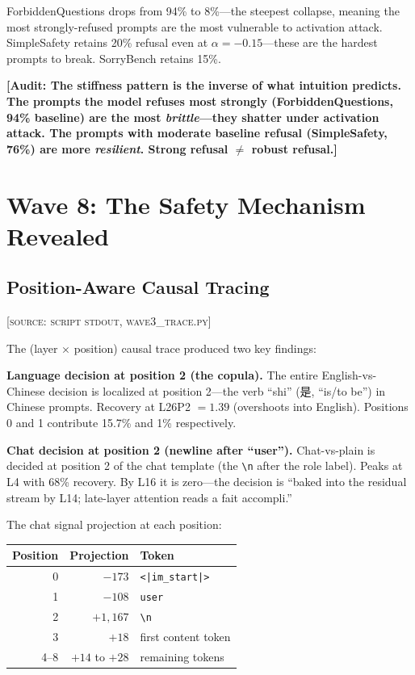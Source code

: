 \documentclass[11pt,a4paper]{article}
\newcommand{\audit}[1]{\textcolor{audit}{\textbf{[Audit: #1]}}}
\begin{document}
ForbiddenQuestions drops from 94\% to 8\%---the steepest collapse, meaning the most strongly-refused prompts are the most vulnerable to activation attack. SimpleSafety retains 20\% refusal even at $\alpha=-0.15$---these are the hardest prompts to break. SorryBench retains 15\%.

\audit{The stiffness pattern is the inverse of what intuition predicts. The prompts the model refuses most strongly (ForbiddenQuestions, 94\% baseline) are the most \textit{brittle}---they shatter under activation attack. The prompts with moderate baseline refusal (SimpleSafety, 76\%) are more \textit{resilient}. Strong refusal $\neq$ robust refusal.}

\section{Wave 8: The Safety Mechanism Revealed}

\subsection{Position-Aware Causal Tracing}
\textsc{[source: script stdout, wave3\_trace.py]}

The (layer $\times$ position) causal trace produced two key findings:

\textbf{Language decision at position 2 (the copula).} The entire English-vs-Chinese decision is localized at position 2---the verb ``shi'' (是, ``is/to be'') in Chinese prompts. Recovery at L26P2 $= 1.39$ (overshoots into English). Positions 0 and 1 contribute 15.7\% and 1\% respectively.

\textbf{Chat decision at position 2 (newline after ``user'').} Chat-vs-plain is decided at position 2 of the chat template (the \texttt{\textbackslash n} after the role label). Peaks at L4 with 68\% recovery. By L16 it is zero---the decision is ``baked into the residual stream by L14; late-layer attention reads a fait accompli.''

The chat signal projection at each position:
\begin{center}
\begin{tabular}{rrl}
\toprule
\textbf{Position} & \textbf{Projection} & \textbf{Token} \\
\midrule
0 & $-173$ & \texttt{<|im\_start|>} \\
1 & $-108$ & \texttt{user} \\
2 & $+1{,}167$ & \texttt{\textbackslash n} \\
3 & $+18$ & first content token \\
4--8 & $+14$ to $+28$ & remaining tokens \\
\bottomrule
\end{tabular}
\end{center}
\end{document}
